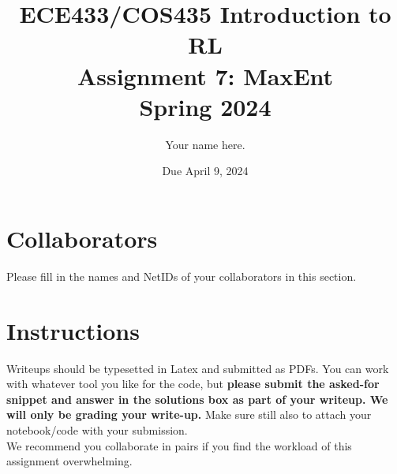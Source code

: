 \documentclass[12pt]{article}
\date{Due April 9, 2024}
\author{\begin{fillme}[width=0.3\textwidth]
 Your name here.
\end{fillme}} %
\title{ECE433/COS435 Introduction to RL\\
  Assignment 7: MaxEnt\\
  Spring 2024\\
}
\begin{document}
  \maketitle
  \section*{Collaborators}
\begin{fillme}
 Please fill in the names and NetIDs of your collaborators in this section.
\end{fillme}

\section*{Instructions}

Writeups should be typesetted in Latex and submitted as PDFs. You can work with whatever tool you like for the code, but \textbf{please submit the asked-for snippet and answer in the solutions box as part of your writeup. We will only be grading your write-up.} Make sure still also to attach your notebook/code with your submission.\\


\noindent We recommend you collaborate in pairs if you find the workload of this assignment overwhelming.
\end{document}
